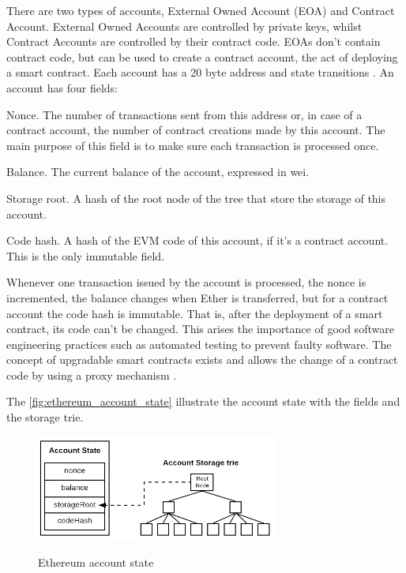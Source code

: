 \documentclass[
    article, 
    12pt,				%
	oneside,			%
	a4paper,			%
	chapter=TITLE,		%
	section=TITLE,		%
	english,			%
	english,				%
	sumario=tradicional
]{abntex2}
\begin{document}
There are two types of accounts, External Owned Account (EOA) and Contract Account.
External Owned Accounts are controlled by private keys, whilst Contract Accounts are controlled by their contract code.
EOAs don't contain contract code, but can be used to create a contract account, the act of deploying a smart contract.
Each account has a 20 byte address and state transitions \cite{wood_ethereum_2021}. 
An account has four fields:

\begin{alineas}
    \item Nonce. 
    The number of transactions sent from this address or, in case of a contract account, the number of contract creations made by this account.
    The main purpose of this field is to make sure each transaction is processed once. 
    
    \item Balance. 
    The current balance of the account, expressed in wei.
    
    \item Storage root.
    A hash of the root node of the tree that store the storage of this account.
    
    \item Code hash.
    A hash of the EVM code of this account, if it's a contract account.
    This is the only immutable field.
\end{alineas}

Whenever one transaction issued by the account is processed, the nonce is incremented, the balance changes when Ether is transferred, but for a contract account the code hash is immutable.
That is, after the deployment of a smart contract, its code can't be changed.
This arises the importance of good software engineering practices such as automated testing to prevent faulty software.
The concept of upgradable smart contracts exists and allows the change of a contract code by using a proxy mechanism \cite{openzeppelin_proxy_upgrade}.

The \autoref{fig:ethereum_account_state} illustrate the account state with the fields and the storage trie.

\begin{figure}[ht]
    \centering
    \caption{Ethereum account state}
    \includegraphics[width=300px]{images/Account-state.png}
    \label{fig:ethereum_account_state}
\end{figure}
\end{document}
